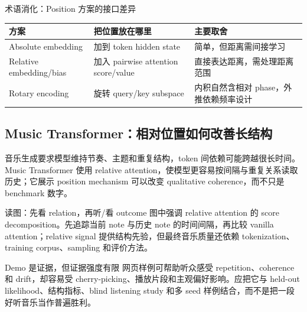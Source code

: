 
\begin{knowledgebox}{术语消化：Position 方案的接口差异}
\begin{tabularx}{\textwidth}{@{}L{0.20\textwidth}X X@{}}
\toprule
方案 & 把位置放在哪里 & 主要取舍 \\
\midrule
Absolute embedding & 加到 token hidden state & 简单，但距离需间接学习 \\
Relative embedding/bias & 加入 pairwise attention score/value & 直接表达距离，需处理距离范围 \\
Rotary encoding & 旋转 query/key subspace & 内积自然含相对 phase，外推依赖频率设计 \\
\bottomrule
\end{tabularx}
\end{knowledgebox}

\subsection{Music Transformer：相对位置如何改善长结构}

音乐生成要求模型维持节奏、主题和重复结构，token 间依赖可能跨越很长时间。Music Transformer 使用 relative attention，使模型更容易按间隔与重复关系读取历史；它展示 position mechanism 可以改变 qualitative coherence，而不只是 benchmark 数字。


\begin{knowledgebox}{读图：先看 relation，再听/看 outcome}
图中强调 relative attention 的 score decomposition。先追踪当前 note 与历史 note 的时间间隔，再比较 vanilla attention；relative signal 提供结构先验，但最终音乐质量还依赖 tokenization、training corpus、sampling 和评价方法。
\end{knowledgebox}


\begin{warningbox}{Demo 是证据，但证据强度有限}
网页样例可帮助听众感受 repetition、coherence 和 drift，却容易受 cherry-picking、播放片段和主观偏好影响。应把它与 held-out likelihood、结构指标、blind listening study 和多 seed 样例结合，而不是把一段好听音乐当作普遍胜利。
\end{warningbox}

